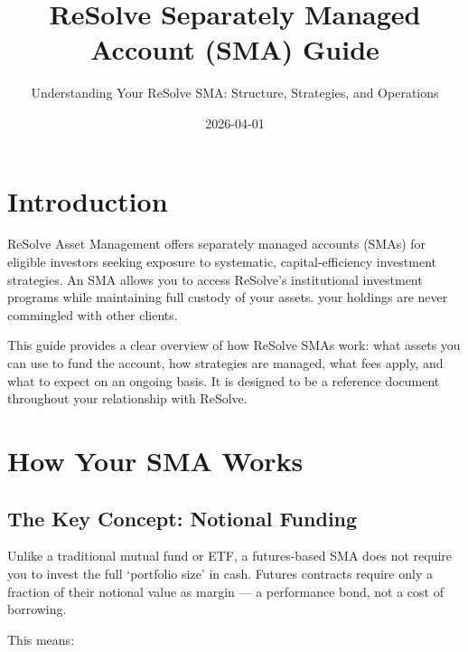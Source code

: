 \documentclass{resolve-whitepaper}
\title{ReSolve Separately Managed Account (SMA) Guide}
\subtitle{Understanding Your ReSolve SMA: Structure, Strategies, and
Operations}
\author{}
\date{2026-04-01}
\begin{document}
\clearpage
\tableofcontents
\clearpage


\section{Introduction}\label{introduction}

ReSolve Asset Management offers separately managed accounts (SMAs) for
eligible investors seeking exposure to systematic, capital-efficiency
investment strategies. An SMA allows you to access ReSolve's
institutional investment programs while maintaining full custody of your
assets. your holdings are never commingled with other clients.

This guide provides a clear overview of how ReSolve SMAs work: what
assets you can use to fund the account, how strategies are managed, what
fees apply, and what to expect on an ongoing basis. It is designed to be
a reference document throughout your relationship with ReSolve.

\sectionpagebreak

\section{How Your SMA Works}\label{how-your-sma-works}

\subsection{The Key Concept: Notional
Funding}\label{the-key-concept-notional-funding}

Unlike a traditional mutual fund or ETF, a futures-based SMA does not
require you to invest the full `portfolio size' in cash. Futures
contracts require only a fraction of their notional value as margin ---
a performance bond, not a cost of borrowing.

This means:
\end{document}

